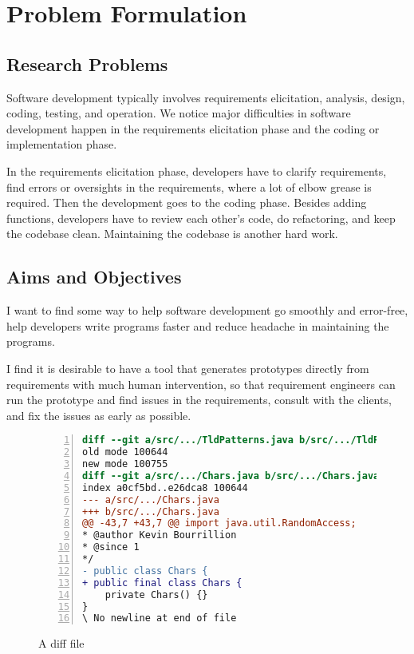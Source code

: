 \chapter{Problem Formulation}

\section{Research Problems}


Software development typically involves requirements elicitation, analysis, design, coding, testing, and operation. We notice major difficulties in software development happen in the requirements elicitation phase and the coding or implementation phase.

In the requirements elicitation phase, developers have to clarify requirements, find errors or oversights in the requirements, where a lot of elbow grease is required. Then the development goes to the coding phase. Besides adding functions, developers have to review each other's code, do refactoring, and keep the codebase clean. Maintaining the codebase is another hard work.



\section{Aims and Objectives}

I want to find some way to help software development go smoothly and error-free, help developers write programs faster and reduce headache in maintaining the programs.

I find it is desirable to have a tool that generates prototypes directly from requirements with much human intervention, so that requirement engineers can run the prototype and find issues in the requirements, consult with the clients, and fix the issues as early as possible.


\begin{figure}[ht]
\begin{lstlisting}[language=diff, breaklines=true, numbers=left, xleftmargin=2em]
diff --git a/src/.../TldPatterns.java b/src/.../TldPatterns.java
old mode 100644
new mode 100755
diff --git a/src/.../Chars.java b/src/.../Chars.java
index a0cf5bd..e26dca8 100644
--- a/src/.../Chars.java
+++ b/src/.../Chars.java
@@ -43,7 +43,7 @@ import java.util.RandomAccess;
* @author Kevin Bourrillion
* @since 1
*/
- public class Chars {
+ public final class Chars {
	private Chars() {}
}
\ No newline at end of file
\end{lstlisting}
\caption{A diff file}
\label{fig:example-diff}
\end{figure}

